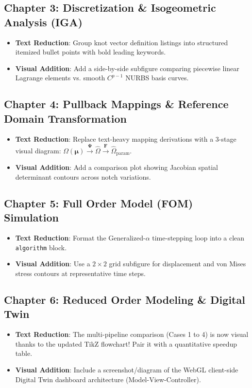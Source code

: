 \documentclass[12pt,a4paper]{article}
\begin{document}
\subsection{Chapter 3: Discretization \& Isogeometric Analysis (IGA)}
\begin{itemize}[leftmargin=*]
    \item \textbf{Text Reduction}: Group knot vector definition listings into structured itemized bullet points with bold leading keywords.
    \item \textbf{Visual Addition}: Add a side-by-side subfigure comparing piecewise linear Lagrange elements vs. smooth $C^{p-1}$ NURBS basis curves.
\end{itemize}

\subsection{Chapter 4: Pullback Mappings \& Reference Domain Transformation}
\begin{itemize}[leftmargin=*]
    \item \textbf{Text Reduction}: Replace text-heavy mapping derivations with a 3-stage visual diagram: $\Omega(\boldsymbol{\mu}) \xrightarrow{\boldsymbol{\Psi}} \hat{\Omega} \xrightarrow{\mathbf{F}} \hat{\Omega}_{\text{param}}$.
    \item \textbf{Visual Addition}: Add a comparison plot showing Jacobian spatial determinant contours across notch variations.
\end{itemize}

\subsection{Chapter 5: Full Order Model (FOM) Simulation}
\begin{itemize}[leftmargin=*]
    \item \textbf{Text Reduction}: Format the Generalized-$\alpha$ time-stepping loop into a clean \texttt{algorithm} block.
    \item \textbf{Visual Addition}: Use a $2 \times 2$ grid subfigure for displacement and von Mises stress contours at representative time steps.
\end{itemize}

\subsection{Chapter 6: Reduced Order Modeling \& Digital Twin}
\begin{itemize}[leftmargin=*]
    \item \textbf{Text Reduction}: The multi-pipeline comparison (Cases 1 to 4) is now visual thanks to the updated TikZ flowchart! Pair it with a quantitative speedup table.
    \item \textbf{Visual Addition}: Include a screenshot/diagram of the WebGL client-side Digital Twin dashboard architecture (Model-View-Controller).
\end{itemize}
\end{document}
